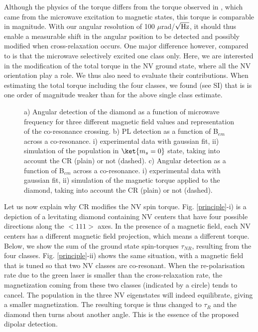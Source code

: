 \documentclass[preprintnumbers,amsmath,amssymb,superscriptaddress,twocolumn,showpacs]{revtex4-1}
\begin{document}
Although the physics of the torque differs from the torque observed in \cite{DelordNat}, which came from the microwave excitation to magnetic states, this torque is comparable in magnitude. With our angular resolution of 100 $\mu$rad/$\sqrt{\rm Hz}$, it should thus enable a measurable shift in the angular position to be detected and possibly modified when cross-relaxation occurs. 
One major difference however, compared to \cite{DelordNat} is that the microwave selectively excited one class only. 
Here, we are interested in the modification of the total torque in the NV ground state, where all the NV orientation play a role. We thus also need to evaluate their contributions.
When estimating the total torque including the four classes, we found (see SI) that is is one order of magnitude weaker than for the above single class estimate.

\begin{figure*}[!ht]
  \centering {}
  \caption{a) Angular detection of the diamond as a function of microwave frequency for three different magnetic field values and representation of the co-resonance crossing.
b) PL detection as a function of B$_{em}$ across a co-resonance. i) experimental data with gaussian fit, ii) simulation of the population in $\ket{m_s=0}$ state, taking into account the CR (plain) or not (dashed).
c) Angular detection as a function of B$_{em}$ across a co-resonance. i) experimental data with gaussian fit, ii) simulation of the magnetic torque applied to the diamond, taking into account the CR (plain) or not (dashed).
  }
  \label{data}
\end{figure*}

Let us now explain why CR modifies the NV spin torque.
Fig. \ref{principle}-i) is a depiction of a levitating diamond containing NV centers that have four possible directions along the $<111>$ axes. 
In the presence of a magnetic field, each NV centers has a different magnetic field projection, which means a different torque. 
Below, we show the sum of the ground state spin-torques $\tau_{NR}$, resulting from the four classes. 
Fig. \ref{principle}-ii) shows the same situation, with a magnetic field that is tuned so that two NV classes are co-resonant. 
When the re-polarisation rate due to the green laser is smaller than the cross-relaxation rate, the magnetization coming from these two classes (indicated by a circle) tends to cancel. The population in the three NV eigenstates will indeed equilibrate, giving a smaller magnetization.
The resulting torque is thus changed to $\tau_{R}$ and the diamond then turns about another angle.
This is the essence of the proposed dipolar detection. 
\end{document}
